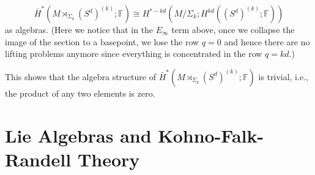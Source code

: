 \documentclass{amsart}
\newcommand{\FF}{\mathbb{F}}
\newcommand{\MtsigSd}{ M \rtimes_{\Sigma_k} (S^d)^{(k)}}
\begin{document}
$$
\bar{H}^*(\MtsigSd; \FF) \cong H^{*-kd}(M/\Sigma_k; H^{kd}((S^d)^{(k)}; \FF))
$$
as algebras. (Here we notice that in the $E_{\infty}$ term above, 
once we collapse the image of the section to a basepoint, we lose 
the row $q=0$ and hence there are no lifting problems anymore since 
everything is concentrated in the row $q=kd$.)

This shows that the algebra structure of $\bar{H}^*(\MtsigSd; \FF)$ is 
trivial, i.e., the product of any two elements is zero.

\section{Lie Algebras and Kohno-Falk-Randell Theory}




%
\end{document}
